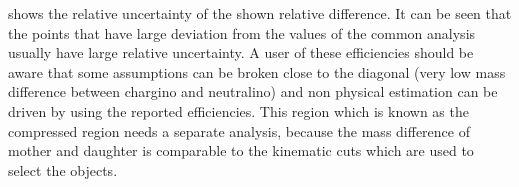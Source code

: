 shows the relative uncertainty of the shown relative difference. It can be seen that the points that have large deviation from the values of the common analysis 
usually have large relative uncertainty. A user of these efficiencies should be aware that some assumptions can be
broken close to the diagonal (very low mass difference between chargino and neutralino) and non physical estimation 
can be driven by using the reported efficiencies. This region which is known as the compressed region needs a separate analysis, 
because the mass difference of mother and daughter is comparable to the kinematic cuts which are used to select the objects.

